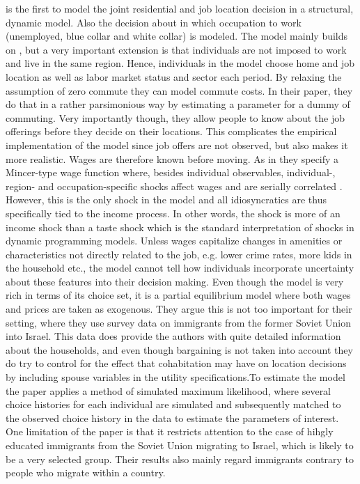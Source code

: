 \citet{Buchinsky2014} is the first to model the joint residential and job location decision in a structural, dynamic model. Also the decision about in which occupation to work (unemployed, blue collar and white collar) is modeled. The model mainly builds on \citet{KennanWalker2011}, but a very important extension is that individuals are not imposed to work and live in the same region. Hence, individuals in the model choose home and job location as well as labor market status and sector each period. By relaxing the assumption of zero commute they can model commute costs. In their paper, they do that in a rather parsimonious way by estimating a parameter for a dummy of commuting. Very importantly though, they allow people to know about the job offerings before they decide on their locations. This complicates the empirical implementation of the model since job offers are not observed, but also makes it more realistic. Wages are therefore known before moving. As in \citet{KennanWalker2011} they specify a Mincer-type wage function where, besides individual observables, individual-, region- and occupation-specific shocks affect wages and are serially correlated . However, this is the only shock in the model and all idiosyncratics are thus specifically tied to the income process. In other words, the shock is more of an income shock than a taste shock which is the standard interpretation of shocks in dynamic programming models. Unless wages capitalize changes in amenities or characteristics not directly related to the job, e.g. lower crime rates, more kids in the household etc., the model cannot tell how individuals incorporate uncertainty about these features into their decision making. Even though the model is very rich in terms of its choice set, it is a partial equilibrium model where both wages and prices are taken as exogenous. They argue this is not too important for their setting, where they use survey data on immigrants from the former Soviet Union into Israel. This data does provide the authors with quite detailed information about the households, and even though bargaining is not taken into account they do try to control for the effect that cohabitation may have on location decisions by including spouse variables in the utility specifications.To estimate the model the paper applies a method of simulated maximum likelihood, where several choice histories for each individual are simulated and subsequently matched to the observed choice history in the data to estimate the parameters of interest. One limitation of the paper is that it restricts attention to the case of hihgly educated immigrants from the Soviet Union migrating to Israel, which is likely to be a very selected group. Their results also mainly regard immigrants contrary to people who migrate within a country.  

